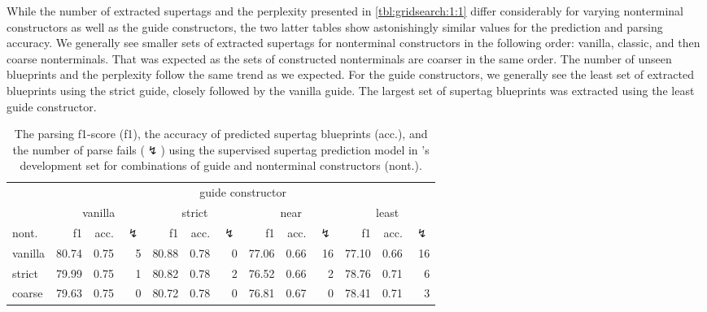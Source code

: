 \documentclass[../../document.tex]{subfiles}
\begin{document}
    While the number of extracted supertags and the perplexity presented in \cref{tbl:gridsearch:1:1} differ considerably for varying nonterminal constructors as well as the guide constructors, the two latter tables show astonishingly similar values for the prediction and parsing accuracy.
    We generally see smaller sets of extracted supertags for nonterminal constructors in the following order: vanilla, classic, and then coarse nonterminals.
    That was expected as the sets of constructed nonterminals are coarser in the same order.
    The number of unseen blueprints and the perplexity follow the same trend as we expected.
    For the guide constructors, we generally see the least set of extracted blueprints using the strict guide,  closely followed by the vanilla guide.
    The largest set of supertag blueprints was extracted using the least guide constructor.

    \begin{table}
        \caption{\label{tbl:gridsearch:1:2}
            The parsing f1-score (f1), the accuracy of predicted supertag blueprints (acc.), and the number of parse fails ($\lightning$) using the supervised supertag prediction model in \negra{}'s development set for combinations of guide and nonterminal constructors (nont.).
        }
        \centering
        \vspace{.2cm}
        \begin{tabular}{l|rrr|rrr|rrr|rrr}
            \toprule
                        & \multicolumn{12}{c}{guide constructor}\\
                        & \multicolumn{3}{c|}{vanilla} & \multicolumn{3}{c|}{strict} & \multicolumn{3}{c|}{near} & \multicolumn{3}{c}{least}  \\
            nont.       & f1 & acc. & $\lightning$ & f1 & acc. & $\lightning$ & f1 & acc. & $\lightning$ & f1 & acc. & $\lightning$  \\ \hline
            vanilla     & 80.74 & 0.75 & 5 & 80.88 & 0.78 & 0 & 77.06 & 0.66 & 16 & 77.10 & 0.66 & 16 \\
            strict      & 79.99 & 0.75 & 1 & 80.82 & 0.78 & 2 & 76.52 & 0.66 &  2 & 78.76 & 0.71 &  6 \\
            coarse      & 79.63 & 0.75 & 0 & 80.72 & 0.78 & 0 & 76.81 & 0.67 &  0 & 78.41 & 0.71 &  3 \\
            \bottomrule
        \end{tabular}
    \end{table}
\end{document}

